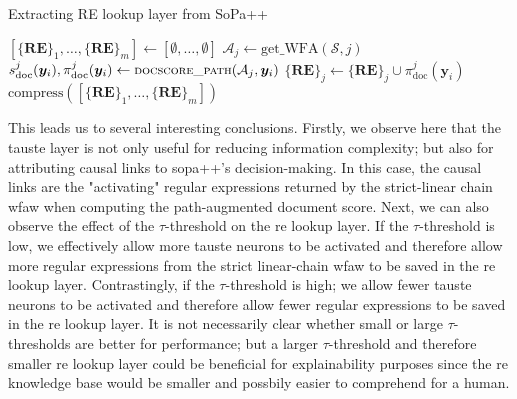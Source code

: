 \begin{algorithm}[t!]
  \small
  \caption{Extracting RE lookup layer from SoPa++}
  \label{algo:simplification_process}
  \begin{algorithmic}[1]
    \Statex
    \State $[\{\textbf{RE}\}_1, \ldots, \{\textbf{RE}\}_m] \gets [\emptyset,
    \ldots, \emptyset]$
    \State $\mathcal{A}_j \gets \text{get\_WFA}(\mathcal{S}, j)$
    \State $s^j_{\text{doc}}(\bm{y}_i), \pi^j_{\text{doc}}(\bm{y}_i) \gets
    {\small\textsc{docscore\_path}}(\mathcal{A}_j, \bm{y}_i)$
    \State $\{\textbf{RE}\}_j \gets \{\textbf{RE}\}_j \cup
    \pi^j_{\text{doc}}(\bm{y}_i)$
    \EndIf
    \EndFor
    \EndFor
    \State \Return $\text{compress}([\{\textbf{RE}\}_1, \ldots, \{\textbf{RE}\}_m])$
    \EndFunction
  \end{algorithmic}
\end{algorithm}

This leads us to several interesting conclusions. Firstly, we observe here that
the \ac{tauste} layer is not only useful for reducing information complexity; but
also for attributing causal links to \ac{sopa}++'s decision-making. In this case,
the causal links are the "activating" regular expressions returned by the
strict-linear chain \ac{wfaw} when computing the path-augmented document
score. Next, we can also observe the effect of the $\tau$-threshold on the \ac{re}
lookup layer. If the $\tau$-threshold is low, we effectively allow more \ac{tauste}
neurons to be activated and therefore allow more regular expressions from the
strict linear-chain \ac{wfaw} to be saved in the \ac{re} lookup layer.
Contrastingly, if the $\tau$-threshold is high; we allow fewer \ac{tauste} neurons to
be activated and therefore allow fewer regular expressions to be saved in the \ac{re}
lookup layer. It is not necessarily clear whether small or large
$\tau$-thresholds are better for performance; but a larger $\tau$-threshold and
therefore smaller \ac{re} lookup layer could be beneficial for explainability
purposes since the \ac{re} knowledge base would be smaller and possbily easier
to comprehend for a human. 

